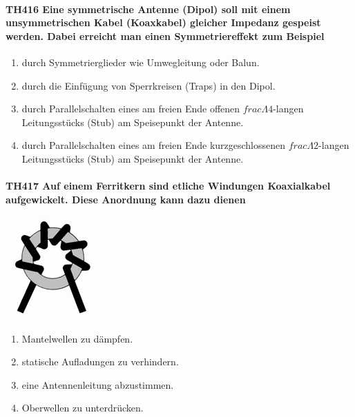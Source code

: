 \documentclass[8pt]{article}
\begin{document}
\paragraph*{TH416 Eine symmetrische Antenne (Dipol) soll mit einem unsymmetrischen Kabel (Koaxkabel) gleicher Impedanz gespeist werden. Dabei erreicht man einen Symmetriereffekt zum Beispiel}
\begin{enumerate}[nolistsep,label=\Alph*]
\item durch Symmetrierglieder wie Umwegleitung oder Balun.
\item durch die Einfügung von Sperrkreisen (Traps) in den Dipol.
\item durch Parallelschalten eines am freien Ende offenen $frac{\Lambda}{4}$-langen Leitungsstücks (Stub) am Speisepunkt der Antenne.
\item durch Parallelschalten eines am freien Ende kurzgeschlossenen $frac{\Lambda}{2}$-langen Leitungsstücks (Stub) am Speisepunkt der Antenne.
\end{enumerate}

\paragraph*{TH417 Auf einem Ferritkern sind etliche Windungen Koaxialkabel aufgewickelt. Diese Anordnung kann dazu dienen} 
\begin{center}
	\begin{minipage}{\linewidth}
		\centering
		\includegraphics[scale=1.0]{pics/th417_a.jpg}
	\end{minipage}
\end{center}
\begin{enumerate}[nolistsep,label=\Alph*]
\item Mantelwellen zu dämpfen.
\item statische Aufladungen zu verhindern.
\item eine Antennenleitung abzustimmen.
\item Oberwellen zu unterdrücken.
\end{enumerate}
\end{document}

